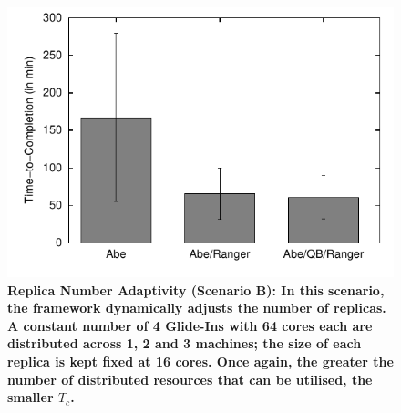 \documentclass{rspublic}
\begin{document}
\begin{figure}[h]
\begin{minipage}[t]{.485\textwidth}
\begin{center}
 \includegraphics[width=\textwidth]{performance/perf_distributed_number_replica.pdf}
 \caption{\footnotesize \bf Replica Number Adaptivity (Scenario B): In
   this scenario, the framework dynamically adjusts the number of
   replicas.  A constant number of 4 Glide-Ins with 64 cores each are
   distributed across 1, 2 and 3 machines; the size of each replica is
   kept fixed at 16 cores. Once again, the greater the number of
   distributed resources that can be utilised, the smaller $T_{c}$.}
      \label{fig:performance_perf_distributed_B}
    \end{center}
  \end{minipage}
  \hfill
\end{figure}
\end{document}
